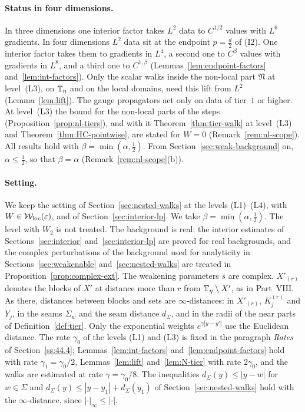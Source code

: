 \paragraph{Status in four dimensions.} In three dimensions one interior factor takes $L^2$ data to $C^{1/2}$ values with $L^6$ gradients. In four dimensions $L^2$ data sit at the endpoint $p=\frac d2$ of (I2). One interior factor takes them to gradients in $L^4$, a second one to $C^\beta$ values with gradients in $L^8$, and a third one to $C^{1,\beta}$ (Lemmas~\ref{lem:endpoint-factors} and~\ref{lem:int-factors}). Only the scalar walks inside the non-local part $\mathfrak N$ at level~(L3), on $\mathbb T_\eta$ and on the local domains, need this lift from $L^2$ (Lemma~\ref{lem:lift}). The gauge propagators act only on data of tier~$1$ or higher. At level~(L3) the bound for the non-local parts of the steps (Proposition~\ref{prop:nl-tiers}), and with it Theorem~\ref{thm:tier-walk} at level~(L3) and Theorem~\ref{thm:HC-pointwise}, are stated for $W=0$ (Remark~\ref{rem:nl-scope}). All results hold with $\beta=\min(\alpha,\frac12)$. From Section~\ref{sec:weak-background} on, $\alpha\le\frac12$, so that $\beta=\alpha$ (Remark~\ref{rem:nl-scope}(b)).

\paragraph{Setting.} We keep the setting of Section~\ref{sec:nested-walks} at the levels (L1)--(L4), with $W\in\mathcal W_{\rm loc}(\varepsilon)$, and of Section~\ref{sec:interior-lp}. We take $\beta=\min(\alpha,\frac12)$. The level with $W_2$ is not treated. The background is real: the interior estimates of Sections~\ref{sec:interior} and~\ref{sec:interior-lp} are proved for real backgrounds, and the complex perturbations of the background used for analyticity in Sections~\ref{sec:weakenable} and~\ref{sec:nested-walks} are treated in Proposition~\ref{prop:complex-ext}. The weakening parameters $s$ are complex. $X'_{(r)}$ denotes the blocks of $X'$ at distance more than $r$ from $\mathbb T_\eta\setminus X'$, as in Part~VIII. As there, distances between blocks and sets are $\infty$-distances: in $X'_{(r)}$, $K_j^{(r)}$ and $Y_j$, in the seams $\Sigma_w$ and the seam distance $d_\Sigma$, and in the radii of the near parts of Definition~\ref{def:tier}. Only the exponential weights $e^{\gamma|y-y'|}$ use the Euclidean distance. The rate $\gamma_0$ of the levels (L1) and (L3) is fixed in the paragraph \emph{Rates} of Section~\ref{ss:44.4}; Lemmas~\ref{lem:int-factors} and~\ref{lem:endpoint-factors} hold with rate $\gamma_1=\gamma_0/2$, Lemmas~\ref{lem:lift} and~\ref{lem:N-tier} with rate $2\gamma_0$, and the walks are estimated at rate $\gamma=\gamma_0/8$. The inequalities $d_\Sigma(y)\le|y-w|$ for $w\in\Sigma$ and $d_\Sigma(y)\le|y-y_1|+d_\Sigma(y_1)$ of Section~\ref{sec:nested-walks} hold with the $\infty$-distance, since $|\cdot|_\infty\le|\cdot|$.

